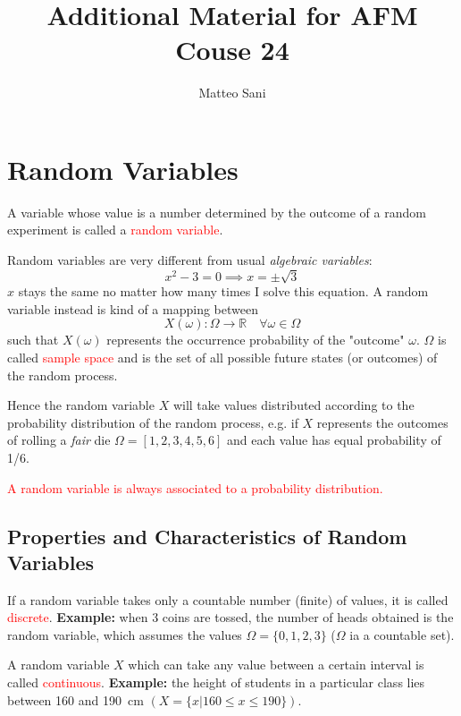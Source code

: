\documentclass[12pt,a4paper]{article}
\title{Additional Material for AFM Couse 24}
\author{Matteo Sani}
\begin{document}
\maketitle

\section{Random Variables}
A variable whose value is a number determined by the outcome of a random experiment is called a \textcolor{red}{random variable}.

Random variables are very different from usual \emph{algebraic variables}:
\begin{equation*}
x^2 - 3 = 0 \implies x = \pm \sqrt{3}
\end{equation*}	
$x$ stays the same no matter how many times I solve this equation.
A random variable instead is kind of a mapping between 
\begin{equation*}
X(\omega):\Omega\rightarrow \mathbb{R}\quad \forall\omega\in\Omega
\end{equation*}
such that $X(\omega)$ represents the occurrence probability of the "outcome" $\omega$. $\Omega$ is called \textcolor{red}{sample space} and is the set of all possible future states (or outcomes) of the random process.
	
Hence the random variable $X$ will take values distributed according to the probability distribution of the random process, e.g. if $X$ represents the outcomes of rolling a \emph{fair} die $\Omega = [1,2,3,4,5,6]$ and each value has equal probability of 1/6.

\textcolor{red}{A random variable is always associated to a probability distribution.}

\subsection{Properties and Characteristics of Random Variables}		If a random variable takes only a countable number (finite) of values, it is called \textcolor{red}{discrete}.
\textbf{Example:} when 3 coins are tossed, the number of heads obtained is the random variable, which assumes the values $\Omega=\{0,1,2,3\}$ ($\Omega$ ia a countable set).

A random variable $X$ which can take any value between a certain interval is called \textcolor{red}{continuous}.
\textbf{Example:} the height of students in a particular class lies between 160 and 190~cm $(X = \{x|160 \leq x \leq 190\})$.
\end{document}
